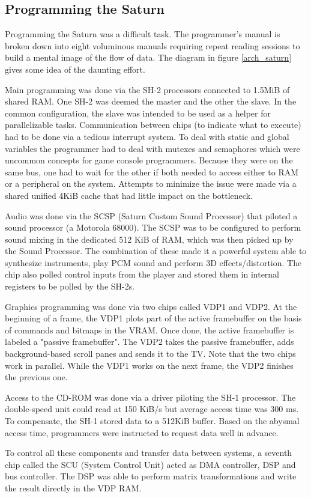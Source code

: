 \subsection{Programming the Saturn}
Programming the Saturn was a difficult task. The programmer's manual is broken down into eight voluminous manuals requiring repeat reading sessions to build a mental image of the flow of data. The diagram in figure \ref{arch_saturn} gives some idea of the daunting effort.\\
\par
Main programming was done via the SH-2 processors connected to 1.5MiB of shared RAM. One SH-2 was deemed the master and the other the slave. In the common configuration, the slave was intended to be used as a helper for parallelizable tasks. Communication between chips (to indicate what to execute) had to be done via a tedious interrupt system. To deal with static and global variables the programmer had to deal with mutexes and semaphores which were uncommon concepts for game console programmers. Because they were on the same bus, one had to wait for the other if both needed to access either to RAM or a peripheral on the system. Attempts to minimize the issue were made via a shared unified 4KiB cache that had little impact on the bottleneck.\\
\par
Audio was done via the SCSP (Saturn Custom Sound Processor) that piloted a sound processor (a Motorola 68000). The SCSP was to be configured to perform sound mixing in the dedicated 512 KiB of RAM, which was then picked up by the Sound Processor. The combination of these made it a powerful system able to synthesize instruments, play PCM sound and perform 3D effects/distortion. The chip also polled control inputs from the player and stored them in internal registers to be polled by the SH-2s.\\
\par
Graphics programming was done via two chips called VDP1 and VDP2. At the beginning of a frame, the VDP1 plots part of the active framebuffer on the basis of commands and bitmaps in the VRAM. Once done, the active framebuffer is labeled a "passive framebuffer". The VDP2 takes the passive framebuffer, adds background-based scroll panes and sends it to the TV. Note that the two chips work in parallel. While the VDP1 works on the next frame, the VDP2 finishes the previous one.\\
\par
Access to the CD-ROM was done via a driver piloting the SH-1 processor. The double-speed unit could read at 150 KiB/s but average access time was 300 ms. To compensate, the SH-1 stored data to a 512KiB buffer. Based on the abysmal access time, programmers were instructed to request data well in advance.\\ 
\par
To control all these components and transfer data between systems, a seventh chip called the SCU (System Control Unit) acted as DMA controller, DSP and bus controller. The DSP was able to perform matrix transformations and write the result directly in the VDP RAM.\\
\par


